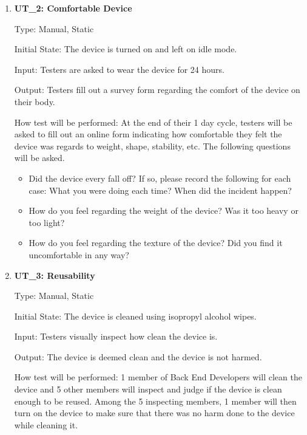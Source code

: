 \documentclass[12pt, titlepage]{article}
\begin{document}
\begin{enumerate}
\item\textbf{{UT\_2: Comfortable Device\\}}\label{UT2}

Type: Manual, Static
					
Initial State: The device is turned on and left on idle mode.
					
Input: Testers are asked to wear the device for 24 hours.
					
Output: Testers fill out a survey form regarding the comfort of the device on their body.
					
How test will be performed: At the end of their 1 day cycle, testers will be asked to fill out an online form indicating how comfortable they felt the device was regards to weight, shape, stability, etc. The following questions will be asked.

\begin{itemize}
\item Did the device every fall off? If so, please record the following for each case: What you were doing each time? When did the incident happen?
\item How do you feel regarding the weight of the device? Was it too heavy or too light?
\item How do you feel regarding the texture of the device? Did you find it uncomfortable in any way?
\end{itemize}

\item\textbf{{UT\_3: Reusability\\}}\label{UT3}

Type: Manual, Static
					
Initial State: The device is cleaned using isopropyl alcohol wipes.
					
Input: Testers visually inspect how clean the device is.
					
Output: The device is deemed clean and the device is not harmed.
					
How test will be performed: 1 member of Back End Developers will clean the device and 5 other members will inspect and judge if the device is clean enough to be reused. Among the 5 inspecting members, 1 member will then turn on the device to make sure that there was no harm done to the device while cleaning it.

\end{enumerate}


\pagebreak
\end{document}
